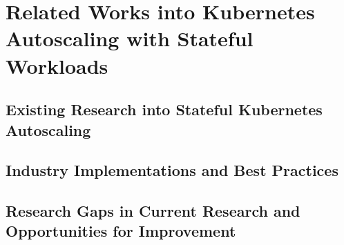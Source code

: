 \newpage
\section{Related Works into Kubernetes Autoscaling with Stateful Workloads}
\label{sec:related-work}

\subsection{Existing Research into Stateful Kubernetes Autoscaling}
\label{subsec:existing-research}

\subsection{Industry Implementations and Best Practices}
\label{subsec:industry-best-practices}

\subsection{Research Gaps in Current Research and Opportunities for Improvement}
\label{subsec:research-gaps}